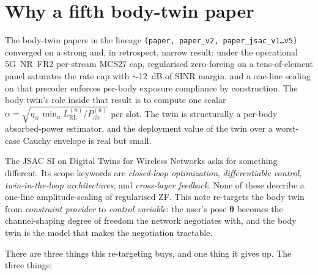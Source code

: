 \documentclass[11pt,a4paper]{article}
\theoremstyle{definition}
\newcommand{\thetab}{\bm{\theta}}
\begin{document}
\tableofcontents
\bigskip

\section{Why a fifth body-twin paper}\label{sec:why}

The body-twin papers in the lineage \texttt{(paper, paper\_v2,
paper\_jsac\_v1\dots v5)} converged on a strong and, in retrospect,
narrow result: under the operational \mbox{5G NR FR2} per-stream
MCS27 cap, regularised zero-forcing on a tens-of-element panel
saturates the rate cap with $\sim$\SI{12}{dB} of SINR margin, and a
one-line scaling on that precoder enforces per-body exposure
compliance by construction.  The body twin's role inside that result
is to compute one scalar
$\alpha=\sqrt{\eta_S\,\min_u L_{\mathrm{RL}}^{(u)}/P_{\mathrm{ab}}^{(u)}}$
per slot.  The twin is structurally a per-body absorbed-power
estimator, and the deployment value of the twin over a worst-case
Cauchy envelope is real but small.

The JSAC SI on Digital Twins for Wireless Networks asks for
something different.  Its scope keywords are
\emph{closed-loop optimization}, \emph{differentiable control},
\emph{twin-in-the-loop architectures}, and
\emph{cross-layer feedback}.  None of these describe a one-line
amplitude-scaling of regularised ZF.  This note re-targets the body
twin from \emph{constraint provider} to \emph{control variable}: the
user's pose $\thetab$ becomes the channel-shaping degree of freedom
the network negotiates with, and the body twin is the model that
makes the negotiation tractable.

There are three things this re-targeting buys, and one thing it gives
up.  The three things:
\end{document}
